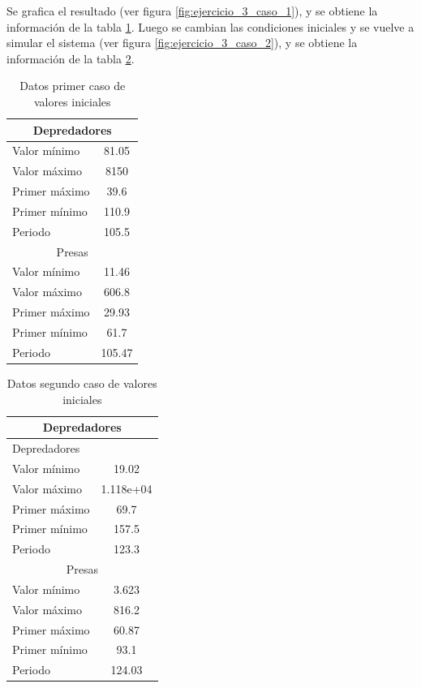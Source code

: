 \documentclass[12pt,letterpaper]{article}
\begin{document}
Se grafica el resultado (ver figura \ref{fig:ejercicio_3_caso_1}), y se obtiene la información de la tabla \ref{table:ejercicio31}. Luego se cambian las condiciones iniciales y se vuelve a simular el sistema (ver figura \ref{fig:ejercicio_3_caso_2}), y se obtiene la información de la tabla \ref{table:ejercicio32}.


\begin{table}
\caption{Datos primer caso de valores iniciales}
\label{table:ejercicio31}
\centering
\begin{tabular}{| l | c |}
  \hline
 \multicolumn{2}{|c|}{Depredadores} \\
 \hline
 Valor mínimo &81.05 \\
 Valor máximo &8150\\
 Primer máximo&39.6\\
 Primer mínimo&110.9\\
 Periodo      &105.5\\
 \hline
 \multicolumn{2}{|c|}{Presas} \\
 \hline
 Valor mínimo &11.46\\
 Valor máximo &606.8\\
 Primer máximo&29.93\\
 Primer mínimo&61.7\\
 Periodo      &105.47\\
 \hline
\end{tabular}
\end{table}


\begin{table}
\caption{Datos segundo caso de valores iniciales}
\label{table:ejercicio32}
\centering
\begin{tabular}{| l| c| }
\hline
  \multicolumn{2}{|c|}{Depredadores} \\
\hline
  Depredadores & \\
  Valor mínimo &19.02\\
  Valor máximo &1.118e+04\\
  Primer máximo&69.7\\
  Primer mínimo&157.5\\
  Periodo      &123.3\\
\hline
  \multicolumn{2}{|c|}{Presas} \\
\hline
  Valor mínimo &3.623\\
  Valor máximo &816.2\\
  Primer máximo&60.87\\
  Primer mínimo&93.1\\
  Periodo      &124.03\\
\hline 
\end{tabular}
\end{table}
\end{document}
